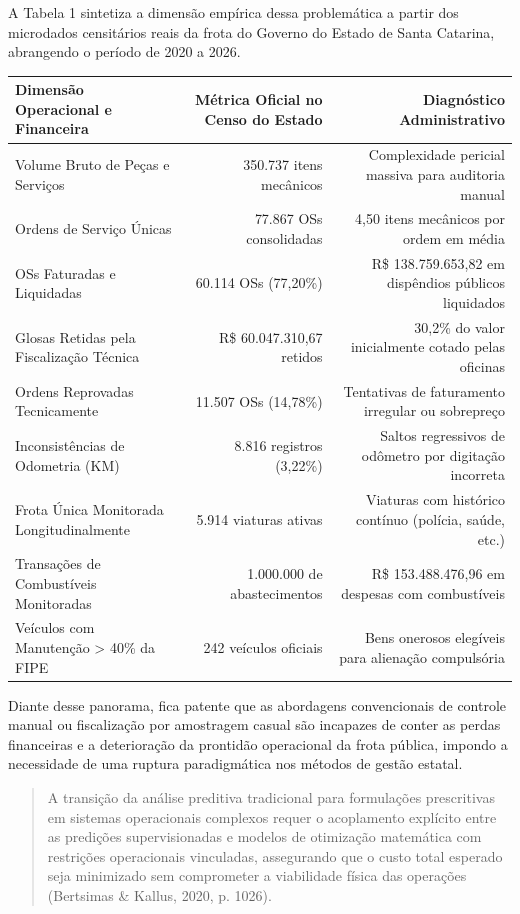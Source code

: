 \documentclass[12pt,a4paper]{article}
\begin{document}
A Tabela 1 sintetiza a dimensão empírica dessa problemática a partir dos microdados censitários reais da frota do Governo do Estado de Santa Catarina, abrangendo o período de 2020 a 2026.

\begin{table}[htbp]
\centering
\small
\begin{tabular}{lrr}
\toprule
\textbf{Dimensão Operacional e Financeira} & \textbf{Métrica Oficial no Censo do Estado} & \textbf{Diagnóstico Administrativo} \\
\midrule
Volume Bruto de Peças e Serviços & 350.737 itens mecânicos & Complexidade pericial massiva para auditoria manual \\
Ordens de Serviço Únicas & 77.867 OSs consolidadas & 4,50 itens mecânicos por ordem em média \\
OSs Faturadas e Liquidadas & 60.114 OSs (77,20\%) & R\$ 138.759.653,82 em dispêndios públicos liquidados \\
Glosas Retidas pela Fiscalização Técnica & R\$ 60.047.310,67 retidos & 30,2\% do valor inicialmente cotado pelas oficinas \\
Ordens Reprovadas Tecnicamente & 11.507 OSs (14,78\%) & Tentativas de faturamento irregular ou sobrepreço \\
Inconsistências de Odometria (KM) & 8.816 registros (3,22\%) & Saltos regressivos de odômetro por digitação incorreta \\
Frota Única Monitorada Longitudinalmente & 5.914 viaturas ativas & Viaturas com histórico contínuo (polícia, saúde, etc.) \\
Transações de Combustíveis Monitoradas & 1.000.000 de abastecimentos & R\$ 153.488.476,96 em despesas com combustíveis \\
Veículos com Manutenção > 40\% da FIPE & 242 veículos oficiais & Bens onerosos elegíveis para alienação compulsória \\
\bottomrule
\end{tabular}
\end{table}

Diante desse panorama, fica patente que as abordagens convencionais de controle manual ou fiscalização por amostragem casual são incapazes de conter as perdas financeiras e a deterioração da prontidão operacional da frota pública, impondo a necessidade de uma ruptura paradigmática nos métodos de gestão estatal.

\begin{quote}
\small A transição da análise preditiva tradicional para formulações prescritivas em sistemas operacionais complexos requer o acoplamento explícito entre as predições supervisionadas e modelos de otimização matemática com restrições operacionais vinculadas, assegurando que o custo total esperado seja minimizado sem comprometer a viabilidade física das operações (Bertsimas \& Kallus, 2020, p. 1026).
\end{quote}
\end{document}
